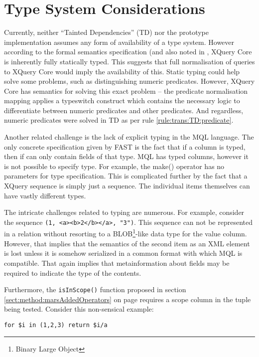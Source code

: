 \section{Type System Considerations}
\label{sect:disc:typeSystem}
Currently, neither ``Tainted Dependencies'' (TD) nor the prototype
implementation assumes any form of availability of a type system. However
according to the formal semantics specification\cite{xquery_semantics} (and
also noted in \cite{pathfinder_compiling_xquery}, XQuery Core is inherently
fully statically typed. This suggests that full normalisation of queries to
XQuery Core would imply the availability of this. Static typing could help
solve some problems, such as distinguishing numeric predicates. However, XQuery
Core has semantics for solving this exact problem -- the predicate normalisation
mapping applies a typeswitch construct which contains the necessary logic to
differentiate between numeric predicates and other predicates. And regardless,
numeric predicates were solved in TD as per rule \ref{rule:trans:TD:predicate}.

Another related challenge is the lack of explicit typing in the MQL language.
The only concrete specification given by FAST is the fact that if a column is
typed, then if can only contain fields of that type. MQL has typed columns,
however it is not possible to specify type. For example, the \textsf{make()}
operator has no parameters for type specification. This is complicated further
by the fact that a XQuery sequence is simply just a sequence. The individual
items themselves can have vastly different types.

The intricate challenges related to typing are numerous. For example, consider
the sequence \texttt{(1, <a><b>2</b></a>, "3")}. This sequence can not be
represented in a relation without resorting to a BLOB\footnote{Binary
Large Object}-like data type for the value column. However, that implies that
the semantics of the second item as an XML element is lost unless it is somehow
serialized in a common format with which MQL is compatible. That again implies
that metainformation about fields may be required to indicate the type of the
contents.

Furthermore, the \texttt{isInScope()} function proposed in section
\ref{sect:method:marsAddedOperators} on page
\pageref{sect:method:marsAddedOperators} requires a scope column in the tuple
being tested. Consider this non-sensical example:

\begin{Verbatim}
for $i in (1,2,3) return $i/a
\end{Verbatim}

